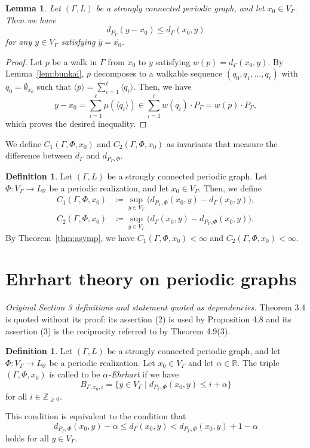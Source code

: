 \documentclass[10pt,a4paper]{amsart}
\theoremstyle{plain}
\newtheorem{lem}[cdrthm]{Lemma}
\theoremstyle{definition}
\newtheorem{defi}[cdrthm]{Definition}
\theoremstyle{remark}
\begin{document}
\setcounter{cdrthm}{22}
\begin{lem}\label{lem:dPd}
Let $(\Gamma , L)$ be a strongly connected periodic graph, and let $x_0 \in V_{\Gamma}$. 
Then we have 
\[
d_{P_{\Gamma}}(y - x_0) \le d_{\Gamma}(x_0, y)
\]
for any $y \in V_{\Gamma}$ satisfying $\overline{y} = \overline{x_0}$. 
\end{lem}
\begin{proof}
Let $p$ be a walk in $\Gamma$ from $x_0$ to $y$ satisfying $w(p) = d_{\Gamma}(x_0, y)$. 
By Lemma~\ref{lem:bunkai}, $\overline{p}$ decomposes to a walkable sequence $(q_0, q_1, \ldots , q_{\ell})$ with $q_0 = \emptyset _{\overline{x_0}}$ such that 
$\langle \overline{p} \rangle = \sum _{i = 1} ^{\ell} \langle q_i \rangle$. 
Then, we have 
\[
y-x_0 
= \sum _{i=1} ^{\ell} \mu(\langle q_i \rangle) 
\in \sum _{i = 1} ^{\ell} w(q_i) \cdot P_{\Gamma} 
= w(p) \cdot P_{\Gamma}, 
\]
which proves the desired inequality. 
\end{proof}

We define $C_{1}(\Gamma, \Phi, x_0)$ and $C_{2}(\Gamma, \Phi, x_0)$ as invariants that measure the difference between $d_{\Gamma}$ and $d_{P_{\Gamma}, \Phi}$. 

\begin{defi}
Let $(\Gamma , L)$ be a strongly connected periodic graph. 
Let $\Phi : V_{\Gamma} \to L_{\mathbb{R}}$ be a periodic realization, and let $x_0 \in V_{\Gamma}$. 
Then, we define 
\begin{align*}
C_{1}(\Gamma, \Phi, x_0) &\coloneqq  \sup _{y \in V_{\Gamma}} \bigl( d_{P_{\Gamma}, \Phi} (x_0, y) - d_{\Gamma} (x_0, y) \bigr), \\
C_{2}(\Gamma, \Phi, x_0) &\coloneqq  \sup _{y \in V_{\Gamma}} \bigl( d_{\Gamma}(x_0, y) - d_{P_{\Gamma}, \Phi} ( x_0, y ) \bigr). 
\end{align*}
By Theorem~\ref{thm:asymp}, we have $C_{1}(\Gamma, \Phi, x_0) < \infty$ and $C_{2}(\Gamma, \Phi, x_0) < \infty$. 
\end{defi}

\section{Ehrhart theory on periodic graphs}\label{section:ETP}

\noindent\textit{Original Section 3 definitions and statement quoted as dependencies.} Theorem 3.4 is quoted without its proof: its assertion (2) is used by Proposition 4.8 and its assertion (3) is the reciprocity referred to by Theorem 4.9(3).
\begin{defi}
Let $(\Gamma , L)$ be a strongly connected periodic graph, 
and let $\Phi : V_{\Gamma} \to L_{\mathbb{R}}$ be a periodic realization. 
Let $x_0 \in V_{\Gamma}$ and let $\alpha \in \mathbb{R}$. 
The triple $(\Gamma, \Phi, x_0)$ is called to be \textit{$\alpha$-Ehrhart} if we have
\[
B_{\Gamma, x_0, i} = 
\{ y \in V_{\Gamma} \mid d_{P_{\Gamma}, \Phi} (x_0, y) \le i + \alpha \}
\]
for all $i \in \mathbb{Z}_{\ge 0}$. 

This condition is equivalent to the condition that 
\[
d_{P_{\Gamma}, \Phi} (x_0, y) - \alpha \le d_{\Gamma} (x_0, y)
< d_{P_{\Gamma}, \Phi} (x_0, y) + 1 - \alpha
\]
holds for all $y \in V_{\Gamma}$. 
\end{defi}
\end{document}
